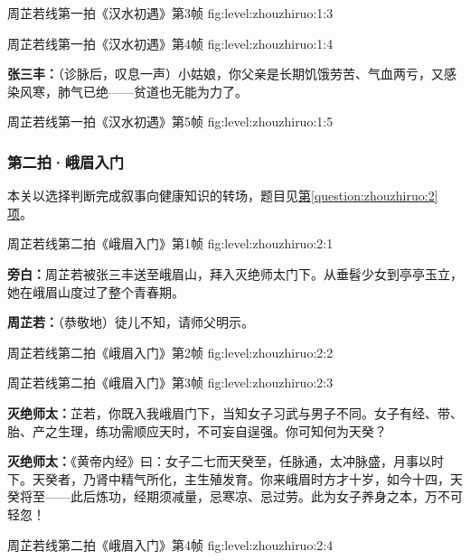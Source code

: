   {周芷若线第一拍《汉水初遇》第3帧}
  {fig:level:zhouzhiruo:1:3}
  {\scriptsize}
  {\mbox{}}

\clearpage

  {周芷若线第一拍《汉水初遇》第4帧}
  {fig:level:zhouzhiruo:1:4}
  {\scriptsize}
  {\textbf{张三丰：}（诊脉后，叹息一声）小姑娘，你父亲是长期饥饿劳苦、气血两亏，又感染风寒，肺气已绝——贫道也无能为力了。\par}

  {周芷若线第一拍《汉水初遇》第5帧}
  {fig:level:zhouzhiruo:1:5}
  {\scriptsize}
  {\mbox{}}

\subsubsection{第二拍·峨眉入门}\label{plot:zhouzhiruo:2}
本关以选择判断完成叙事向健康知识的转场，题目见\hyperref[question:zhouzhiruo:2]{第\ref*{question:zhouzhiruo:2}项}。

  {周芷若线第二拍《峨眉入门》第1帧}
  {fig:level:zhouzhiruo:2:1}
  {\scriptsize}
  {\textbf{旁白：}周芷若被张三丰送至峨眉山，拜入灭绝师太门下。从垂髫少女到亭亭玉立，她在峨眉山度过了整个青春期。\par
\textbf{周芷若：}（恭敬地）徒儿不知，请师父明示。\par}

\clearpage

  {周芷若线第二拍《峨眉入门》第2帧}
  {fig:level:zhouzhiruo:2:2}
  {\scriptsize}
  {\mbox{}}

  {周芷若线第二拍《峨眉入门》第3帧}
  {fig:level:zhouzhiruo:2:3}
  {\tiny}
  {\textbf{灭绝师太：}芷若，你既入我峨眉门下，当知女子习武与男子不同。女子有经、带、胎、产之生理，练功需顺应天时，不可妄自逞强。你可知何为天癸？\par
\textbf{灭绝师太：}《黄帝内经》曰：女子二七而天癸至，任脉通，太冲脉盛，月事以时下。天癸者，乃肾中精气所化，主生殖发育。你来峨眉时方才十岁，如今十四，天癸将至——此后炼功，经期须减量，忌寒凉、忌过劳。此为女子养身之本，万不可轻忽！\par}

  {周芷若线第二拍《峨眉入门》第4帧}
  {fig:level:zhouzhiruo:2:4}
  {\scriptsize}
  {\mbox{}}

